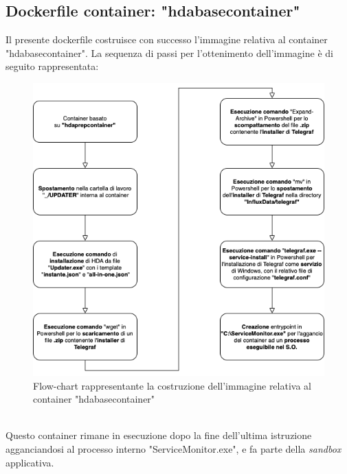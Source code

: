 \subsection{Dockerfile container: "hdabasecontainer"}
Il presente dockerfile costruisce con successo l'immagine relativa al container "hdabasecontainer". La sequenza di passi per l'ottenimento dell'immagine è di seguito rappresentata:
\begin{figure}[!h]     
\centering 
    \includegraphics[width=0.7\columnwidth]{immagini/flowchart/flowchart_hdabasecontainer} 
    \caption{Flow-chart rappresentante la costruzione dell'immagine relativa al container "hdabasecontainer"}
\end{figure} \\
Questo container rimane in esecuzione dopo la fine dell'ultima istruzione agganciandosi al processo interno "ServiceMonitor.exe", e fa parte della \textit{sandbox} applicativa.
\newpage
